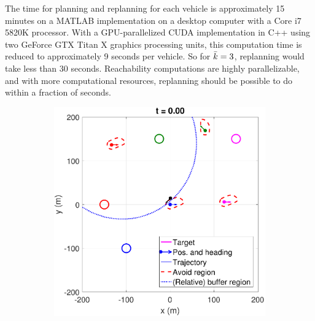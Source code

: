 The time for planning and replanning for each vehicle is approximately 15 minutes on a MATLAB implementation on a desktop computer with a Core i7 5820K processor. With a GPU-parallelized CUDA implementation in C++ using two GeForce GTX Titan X graphics processing units, this computation time is reduced to approximately 9 seconds per vehicle. So for $\bar{k} = 3$, replanning would take less than 30 seconds. Reachability computations are highly parallelizable, and with more computational resources, replanning should be possible to do within a fraction of seconds.

\begin{figure}
\centering
\begin{subfigure}{.5\columnwidth}
  \centering
  \includegraphics[width=\columnwidth]{figs/simulate_bufferRegion_properties_normal_1}
  \subcaption{}
  \label{fig:normalcase1}
\end{subfigure}%
\begin{subfigure}{.5\columnwidth}
  \centering

\end{subfigure}
\end{figure}
